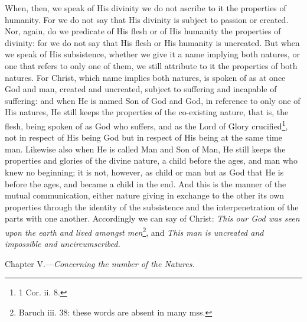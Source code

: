 When, then, we speak of His divinity we do not ascribe to it the properties of humanity. For we do not say that His divinity is subject to passion or created. Nor, again, do we predicate of His flesh or of His humanity the properties of divinity: for we do not say that His flesh or His humanity is uncreated. But when we speak of His subsistence, whether we give it a name implying both natures, or one that refers to only one of them, we still attribute to it the properties of both natures. For Christ, which name implies both natures, is spoken of as at once God and man, created and uncreated, subject to suffering and incapable of suffering: and when He is named Son of God and God, in reference to only one of His natures, He still keeps the properties of the co-existing nature, that is, the flesh, being spoken of as God who suffers, and as the Lord of Glory crucified\footnote{1 Cor. ii. 8.}, not in respect of His being God but in respect of His being at the same time man. Likewise also when He is called Man and Son of Man, He still keeps the properties and glories of the divine nature, a child before the ages, and man who knew no beginning; it is not, however, as child or man but as God that He is before the ages, and became a child in the end. And this is the manner of the mutual communication, either nature giving in exchange to the other its own properties through the identity of the subsistence and the interpenetration of the parts with one another. Accordingly we can say of Christ: \emph{This our God was seen upon the earth and lived amongst men}\footnote{Baruch iii. 38: these words are absent in many mss.}, and \emph{This man is uncreated and impossible and uncircumscribed.}


Chapter V.—\emph{Concerning the number of the Natures.}

